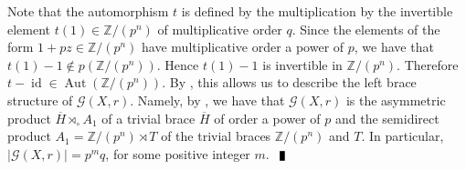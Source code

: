 \documentclass[10pt]{article}
\newcommand{\Z}{\mathbb{Z}}
\newcommand{\id}{\operatorname{id}}
\newcommand{\Aut}{\operatorname{Aut}}
\newenvironment{proof}{\par\noindent{ Proof.}}{$\qed$\par\bigskip}
\newcommand{\qed}{\enspace\vrule  height6pt  width4pt  depth2pt}
\begin{document}
\begin{proof}
	Note that the automorphism $t$ is defined by the multiplication by the invertible element $t(1)\in\Z/(p^n)$ of multiplicative order $q$. Since the elements of the form $1+pz\in\Z/(p^n)$ have multiplicative order a power of $p$, we have that $t(1)-1\notin p(\Z/(p^n))$. Hence $t(1)-1$ is invertible in $\Z/(p^n)$. Therefore $t-\id\in\Aut(\Z/(p^n))$. By \cite[Section 4]{CO24}, this allows us to describe the left brace structure of $\mathcal{G}(X,r)$.  Namely, by \cite[Proposition 4.1, the comments before Lemma 4.2 and Theorem 4.5]{CO24}, we have that $\mathcal{G}(X,r)$ is the asymmetric product $\overline{H}\rtimes_{\circ}A_1$ of a trivial brace $\overline{H}$ of order a power of $p$ and the semidirect product $A_1=\Z/(p^n)\rtimes T$ of the trivial braces $\Z/(p^n)$ and $T$. In particular, $|\mathcal{G}(X,r)|=p^mq$, for some positive integer $m$.
\end{proof}
\end{document}
